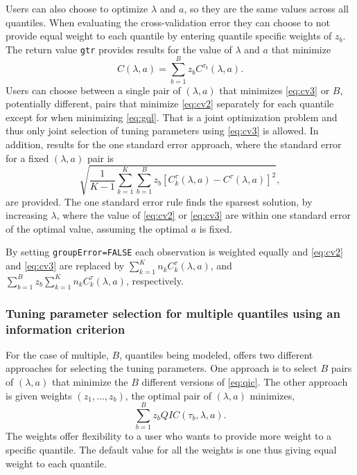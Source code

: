 Users can also choose to optimize \(\lambda\) and \(a\), so they are the same values across all quantiles. When evaluating the cross-validation error they can choose to not provide equal weight to each quantile by entering quantile specific weights of \(z_b\). The return value \texttt{gtr} provides results for the value of \(\lambda\) and \(a\) that minimize
\begin{equation}
C(\lambda,a) = \sum_{b=1}^B z_b C^{\tau_b}(\lambda,a).
\label{eq:cv3}
\end{equation}
Users can choose between a single pair of \((\lambda,a)\) that minimizes \eqref{eq:cv3} or \(B\), potentially different, pairs that minimize \eqref{eq:cv2} separately for each quantile except for when minimizing \eqref{eq:gql}. That is a joint optimization problem and thus only joint selection of tuning parameters using \eqref{eq:cv3} is allowed. In addition, results for the one standard error approach, where the standard error for a fixed \((\lambda,a)\) pair is
\begin{equation}
\sqrt{\frac{1}{K-1}\sum_{k=1}^K \sum_{b=1}^B z_b \left[C_k^\tau(\lambda,a) -C^\tau(\lambda,a) \right]^2},
\end{equation}
are provided. The one standard error rule finds the sparsest solution, by increasing \(\lambda\), where the value of \eqref{eq:cv2} or \eqref{eq:cv3} are within one standard error of the optimal value, assuming the optimal \(a\) is fixed.

By setting \texttt{groupError=FALSE} each observation is weighted equally and \eqref{eq:cv2} and \eqref{eq:cv3} are replaced by \(\sum_{k=1}^K n_k C_k^\tau(\lambda,a)\),
and \(\sum_{b=1}^B z_b \sum_{k=1}^K n_k C_k^\tau(\lambda,a)\), respectively.

\subsubsection{Tuning parameter selection for multiple quantiles using an information criterion}\label{tuning-parameter-selection-for-multiple-quantiles-using-an-information-criterion}

For the case of multiple, \(B\), quantiles being modeled,  offers two different approaches for selecting the tuning parameters. One approach is to select \(B\) pairs of \((\lambda,a)\) that minimize the \(B\) different versions of \eqref{eq:qic}. The other approach is given weights \((z_1,\ldots,z_b)\), the optimal pair of \((\lambda,a)\) minimizes,
\begin{equation}
\sum_{b=1}^B z_b QIC(\tau_b,\lambda,a).
\label{eq:jointQic}
\end{equation}
The weights offer flexibility to a user who wants to provide more weight to a specific quantile. The default value for all the weights is one thus giving equal weight to each quantile.

